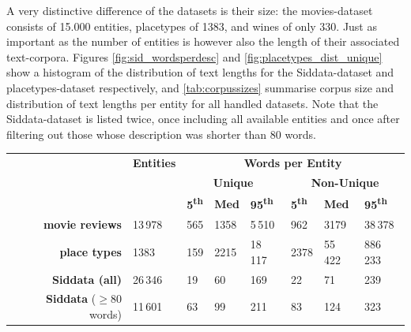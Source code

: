 A very distinctive difference of the datasets is their size: the movies-dataset consists of 15.000 entities, placetypes of 1383, and wines of only 330. Just as important as the number of entities is however also the length of their associated text-corpora. Figures \ref{fig:sid_wordsperdesc} and \ref{fig:placetypes_dist_unique} show a histogram of the distribution of text lengths for the Siddata-dataset and placetypes-dataset respectively, and \autoref{tab:corpussizes} summarise corpus size and distribution of text lengths per entity for all handled datasets. Note that the Siddata-dataset is listed twice, once including all available entities and once after filtering out those whose description was shorter than 80 words.

\begin{table}[H]
	\centering
	\begin{tabular}{r|l|lll|lll}
		&  \textbf{Entities}   & \multicolumn{6}{c}{\textbf{Words per Entity}}                                 \\
		&       & \multicolumn{3}{c}{\textbf{Unique}} & \multicolumn{3}{c}{\textbf{Non-Unique}} \\
	 &  & \textbf{5\textsuperscript{th}} & \textbf{Med} & \textbf{95\textsuperscript{th}} & \textbf{5\textsuperscript{th}} & \textbf{Med} & \textbf{95\textsuperscript{th}} \\ \midrule
	\textbf{movie reviews}             & 13\,978 & 565    & 1358 & 5\,510  & 962   & 3179    & 38\,378     \\
	\textbf{place types}               & 1383    & 159    & 2215 & 18\,117 & 2378  & 55\,422 & 886\,233    \\
	\textbf{Siddata (all)}    		   & 26\,346 & 19     & 60     & 169   & 22    & 71      & 239         \\
	\textbf{Siddata} ($\geq 80$ words) & 11\,601 & 63     & 99     & 211   & 83    & 124     & 323         
	\end{tabular}
	\label{tab:corpussizes}
\end{table}

